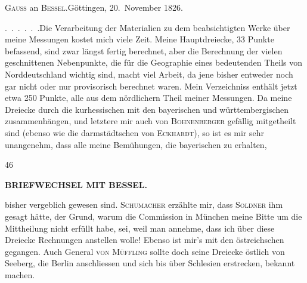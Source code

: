 \begin{center}
\textsc{Gauss} an \textsc{Bessel}.\quad Göttingen, 20.~November 1826.
\end{center}

\par\noindent\hspace*{\parindent}.\ .\ .\ .\ .\ .\quad Die Verarbeitung der Materialien zu dem beabsichtigten Werke über meine Messungen kostet mich viele Zeit.
Meine Hauptdreiecke, 33 Punkte befassend, sind zwar längst fertig berechnet, aber die Berechnung der vielen geschnittenen Nebenpunkte, die für die Geographie eines bedeutenden Theils von Norddeutschland wichtig sind, macht viel Arbeit, da jene bisher entweder noch gar nicht oder nur provisorisch berechnet waren.
Mein Verzeichniss enthält jetzt etwa 250 Punkte, alle aus dem nördlichern Theil meiner Messungen.
Da meine Dreiecke durch die kurhessischen mit den bayerischen und württembergischen zusammenhängen, und letztere mir auch von \textsc{Bohnenberger} gefällig mitgetheilt sind (ebenso wie die darmstädtschen von \textsc{Eckhardt}), so ist es mir sehr unangenehm, dass alle meine Bemühungen, die bayerischen zu erhalten,
\par\smallskip{}\hfill{\footnotesize46}\par
\clearpage
{}\hfill{\small\textbf{BRIEFWECHSEL MIT BESSEL.}}\par\medskip
\noindent bisher vergeblich gewesen sind. \textsc{Schumacher} erzählte mir, dass \textsc{Soldner} ihm gesagt hätte, der Grund, warum die Commission in München meine Bitte um die Mittheilung nicht erfüllt habe, sei, weil man annehme, dass ich über diese Dreiecke Rechnungen anstellen wolle!
Ebenso ist mir's mit den östreichschen gegangen.
Auch General \textsc{von Müffling} sollte doch seine Dreiecke östlich von Seeberg, die Berlin anschliessen und sich bis über Schlesien erstrecken, bekannt machen.

